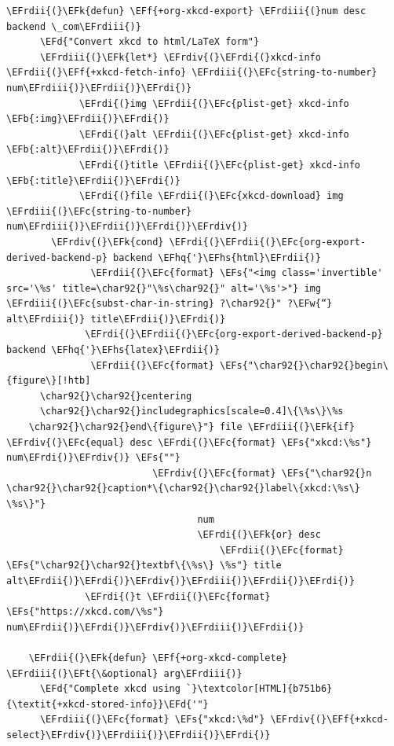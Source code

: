 \documentclass{scrartcl}
\newcommand{\EFk}[1]{\textcolor{EFk}{#1}} %
\newcommand{\EFd}[1]{\textcolor{EFd}{\textit{#1}}} %
\newcommand{\EFt}[1]{\textcolor{EFt}{#1}} %
\newcommand{\EFs}[1]{\textcolor{EFs}{#1}} %
\newcommand{\EFw}[1]{\textcolor{EFw}{#1}} %
\newcommand{\EFb}[1]{\textcolor{EFb}{#1}} %
\newcommand{\EFc}[1]{\textcolor{EFc}{#1}} %
\newcommand{\EFf}[1]{\textcolor{EFf}{#1}} %
\newcommand{\EFhq}[1]{\textcolor{EFhq}{#1}} %
\newcommand{\EFhs}[1]{\textcolor{EFhs}{#1}} %
\newcommand{\EFrdi}[1]{\textcolor{EFrdi}{#1}} %
\newcommand{\EFrdii}[1]{\textcolor{EFrdii}{#1}} %
\newcommand{\EFrdiii}[1]{\textcolor{EFrdiii}{#1}} %
\newcommand{\EFrdiv}[1]{\textcolor{EFrdiv}{#1}} %
\begin{document}
\begin{Code}
\begin{Verbatim}[]
	\EFrdii{(}\EFk{defun} \EFf{+org-xkcd-export} \EFrdiii{(}num desc backend \_com\EFrdiii{)}
	  \EFd{"Convert xkcd to html/LaTeX form"}
	  \EFrdiii{(}\EFk{let*} \EFrdiv{(}\EFrdi{(}xkcd-info \EFrdii{(}\EFf{+xkcd-fetch-info} \EFrdiii{(}\EFc{string-to-number} num\EFrdiii{)}\EFrdii{)}\EFrdi{)}
	         \EFrdi{(}img \EFrdii{(}\EFc{plist-get} xkcd-info \EFb{:img}\EFrdii{)}\EFrdi{)}
	         \EFrdi{(}alt \EFrdii{(}\EFc{plist-get} xkcd-info \EFb{:alt}\EFrdii{)}\EFrdi{)}
	         \EFrdi{(}title \EFrdii{(}\EFc{plist-get} xkcd-info \EFb{:title}\EFrdii{)}\EFrdi{)}
	         \EFrdi{(}file \EFrdii{(}\EFc{xkcd-download} img \EFrdiii{(}\EFc{string-to-number} num\EFrdiii{)}\EFrdii{)}\EFrdi{)}\EFrdiv{)}
	    \EFrdiv{(}\EFk{cond} \EFrdi{(}\EFrdii{(}\EFc{org-export-derived-backend-p} backend \EFhq{'}\EFhs{html}\EFrdii{)}
	           \EFrdii{(}\EFc{format} \EFs{"<img class='invertible' src='\%s' title=\char92{}"\%s\char92{}" alt='\%s'>"} img \EFrdiii{(}\EFc{subst-char-in-string} ?\char92{}" ?\EFw{“} alt\EFrdiii{)} title\EFrdii{)}\EFrdi{)}
	          \EFrdi{(}\EFrdii{(}\EFc{org-export-derived-backend-p} backend \EFhq{'}\EFhs{latex}\EFrdii{)}
	           \EFrdii{(}\EFc{format} \EFs{"\char92{}\char92{}begin\{figure\}[!htb]
	  \char92{}\char92{}centering
	  \char92{}\char92{}includegraphics[scale=0.4]\{\%s\}\%s
	\char92{}\char92{}end\{figure\}"} file \EFrdiii{(}\EFk{if} \EFrdiv{(}\EFc{equal} desc \EFrdi{(}\EFc{format} \EFs{"xkcd:\%s"} num\EFrdi{)}\EFrdiv{)} \EFs{""}
	                      \EFrdiv{(}\EFc{format} \EFs{"\char92{}n  \char92{}\char92{}caption*\{\char92{}\char92{}label\{xkcd:\%s\} \%s\}"}
	                              num
	                              \EFrdi{(}\EFk{or} desc
	                                  \EFrdii{(}\EFc{format} \EFs{"\char92{}\char92{}textbf\{\%s\} \%s"} title alt\EFrdii{)}\EFrdi{)}\EFrdiv{)}\EFrdiii{)}\EFrdii{)}\EFrdi{)}
	          \EFrdi{(}t \EFrdii{(}\EFc{format} \EFs{"https://xkcd.com/\%s"} num\EFrdii{)}\EFrdi{)}\EFrdiv{)}\EFrdiii{)}\EFrdii{)}
	
	\EFrdii{(}\EFk{defun} \EFf{+org-xkcd-complete} \EFrdiii{(}\EFt{\&optional} arg\EFrdiii{)}
	  \EFd{"Complete xkcd using `}\textcolor[HTML]{b751b6}{\textit{+xkcd-stored-info}}\EFd{'"}
	  \EFrdiii{(}\EFc{format} \EFs{"xkcd:\%d"} \EFrdiv{(}\EFf{+xkcd-select}\EFrdiv{)}\EFrdiii{)}\EFrdii{)}\EFrdi{)}
\end{Verbatim}
\end{Code}
\end{document}
